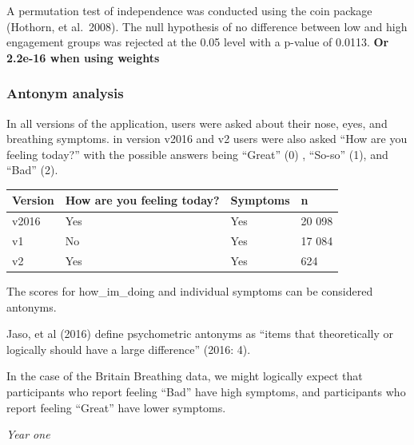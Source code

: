 \documentclass[
]{article}
\begin{document}
A permutation test of independence was conducted using the coin package
(Hothorn, et al.~2008). The null hypothesis of no difference between low
and high engagement groups was rejected at the 0.05 level with a p-value
of 0.0113. \textbf{Or 2.2e-16 when using weights}

\hypertarget{antonym-analysis}{%
\subsubsection{Antonym analysis}\label{antonym-analysis}}

In all versions of the application, users were asked about their nose,
eyes, and breathing symptoms. in version v2016 and v2 users were also
asked ``How are you feeling today?'' with the possible answers being
``Great'' (0) , ``So-so'' (1), and ``Bad'' (2).

\begin{longtable}[]{@{}llll@{}}
\toprule
Version & \textbf{How are you feeling today?} & Symptoms & n \\
\midrule
\endhead
v2016 & Yes & Yes & 20 098 \\
v1 & No & Yes & 17 084 \\
v2 & Yes & Yes & 624 \\
\bottomrule
\end{longtable}

The scores for how\_im\_doing and individual symptoms can be considered
antonyms.

Jaso, et al (2016) define psychometric antonyms as ``items that
theoretically or logically should have a large difference'' (2016: 4).

In the case of the Britain Breathing data, we might logically expect
that participants who report feeling ``Bad'' have high symptoms, and
participants who report feeling ``Great'' have lower symptoms.

\emph{Year one}
\end{document}
